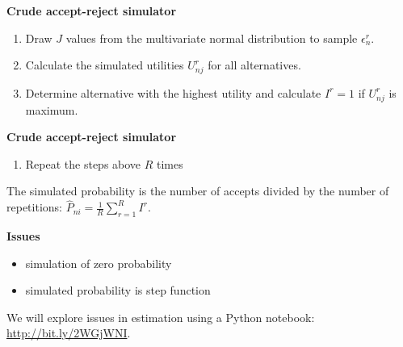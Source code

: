 \begin{frame}\textbf{Crude accept-reject simulator}\vspace{0.3cm}
\begin{enumerate}\setlength\itemsep{1em}
  \item Draw $J$ values from the multivariate normal distribution to sample $\epsilon^r_{n}$.
  \item Calculate the simulated utilities $U^r_{nj}$ for all alternatives.
  \item Determine alternative with the highest utility and calculate $I^r = 1$ if $U^r_{nj}$ is maximum.
\end{enumerate}
\end{frame}
\begin{frame}\textbf{Crude accept-reject simulator}\vspace{0.3cm}
\begin{enumerate}\setlength\itemsep{1em}
  \item Repeat the steps above $R$ times
\end{enumerate}

The simulated probability is the number of accepts divided by the number of repetitions: $\hat{P}_{ni} = \frac{1}{R} \sum^R_{r=1} I^r$.

\end{frame}
\begin{frame}\textbf{Issues}\vspace{0.3cm}
\begin{itemize}\setlength\itemsep{1em}
  \item simulation of zero probability
  \item simulated probability is step function\\
\end{itemize}

We will explore issues in estimation using a Python notebook: \url{http://bit.ly/2WGjWNI}.

\end{frame}
